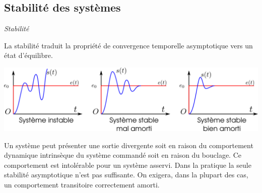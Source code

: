 \documentclass[11pt,oneside]{article}
\begin{document}
\subsection{Stabilité des systèmes}
\begin{defi}
 \textit{\textsf{Stabilité}}

La stabilité traduit la propriété de convergence temporelle asymptotique vers
un état d'équilibre. 
\end{defi}
 \begin{center}
 \includegraphics[width=\textwidth]{png/stabilite}
 \end{center}
Un système peut présenter une sortie divergente soit en
raison du comportement dynamique intrinsèque du système commandé soit en raison
du bouclage. Ce comportement est intolérable pour un système asservi. Dans la
pratique la seule stabilité asymptotique n'est pas suffisante. On exigera, dans
la plupart des cas, un comportement transitoire correctement amorti.


\begin{thebibliography}{2}
\end{thebibliography}
\end{document}
